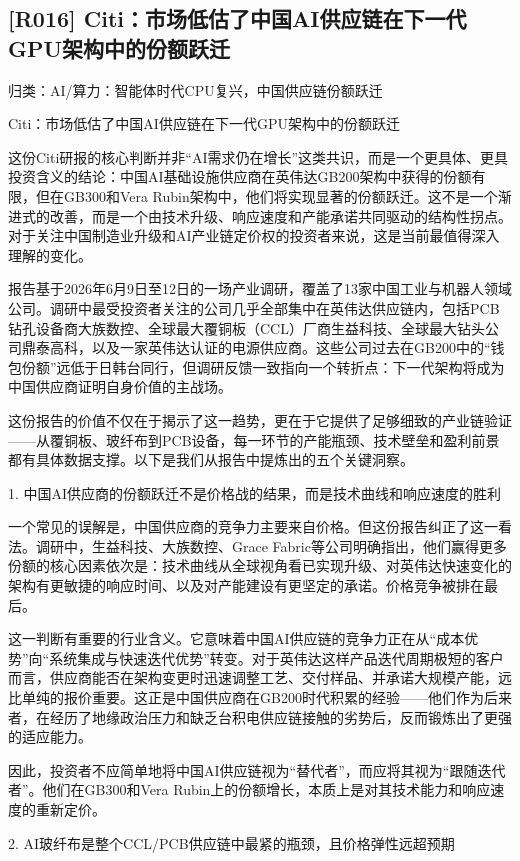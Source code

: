 \documentclass[11pt]{ctexart}
\begin{document}
\subsection{[R016] Citi：市场低估了中国AI供应链在下一代GPU架构中的份额跃迁}
{\small\color{refgray}归类：AI/算力：智能体时代CPU复兴，中国供应链份额跃迁}

Citi：市场低估了中国AI供应链在下一代GPU架构中的份额跃迁

这份Citi研报的核心判断并非“AI需求仍在增长”这类共识，而是一个更具体、更具投资含义的结论：中国AI基础设施供应商在英伟达GB200架构中获得的份额有限，但在GB300和Vera Rubin架构中，他们将实现显著的份额跃迁。这不是一个渐进式的改善，而是一个由技术升级、响应速度和产能承诺共同驱动的结构性拐点。对于关注中国制造业升级和AI产业链定价权的投资者来说，这是当前最值得深入理解的变化。

报告基于2026年6月9日至12日的一场产业调研，覆盖了13家中国工业与机器人领域公司。调研中最受投资者关注的公司几乎全部集中在英伟达供应链内，包括PCB钻孔设备商大族数控、全球最大覆铜板（CCL）厂商生益科技、全球最大钻头公司鼎泰高科，以及一家英伟达认证的电源供应商。这些公司过去在GB200中的“钱包份额”远低于日韩台同行，但调研反馈一致指向一个转折点：下一代架构将成为中国供应商证明自身价值的主战场。

这份报告的价值不仅在于揭示了这一趋势，更在于它提供了足够细致的产业链验证——从覆铜板、玻纤布到PCB设备，每一环节的产能瓶颈、技术壁垒和盈利前景都有具体数据支撑。以下是我们从报告中提炼出的五个关键洞察。

1. 中国AI供应商的份额跃迁不是价格战的结果，而是技术曲线和响应速度的胜利

一个常见的误解是，中国供应商的竞争力主要来自价格。但这份报告纠正了这一看法。调研中，生益科技、大族数控、Grace Fabric等公司明确指出，他们赢得更多份额的核心因素依次是：技术曲线从全球视角看已实现升级、对英伟达快速变化的架构有更敏捷的响应时间、以及对产能建设有更坚定的承诺。价格竞争被排在最后。

这一判断有重要的行业含义。它意味着中国AI供应链的竞争力正在从“成本优势”向“系统集成与快速迭代优势”转变。对于英伟达这样产品迭代周期极短的客户而言，供应商能否在架构变更时迅速调整工艺、交付样品、并承诺大规模产能，远比单纯的报价重要。这正是中国供应商在GB200时代积累的经验——他们作为后来者，在经历了地缘政治压力和缺乏台积电供应链接触的劣势后，反而锻炼出了更强的适应能力。

因此，投资者不应简单地将中国AI供应链视为“替代者”，而应将其视为“跟随迭代者”。他们在GB300和Vera Rubin上的份额增长，本质上是对其技术能力和响应速度的重新定价。

2. AI玻纤布是整个CCL/PCB供应链中最紧的瓶颈，且价格弹性远超预期
\end{document}
